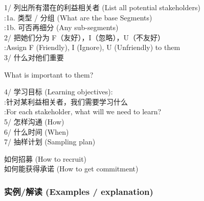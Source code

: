 1/ 列出所有潜在的利益相关者 (List all potential stakeholders)\\
:1a. 类型 / 分组 (What are the base Segments)\\
:1b. 可否再细分 (Any sub-segments)\\
2/ 把她们分为 F（友好），I（忽略），U（不友好）\\
:Assign F (Friendly), I (Ignore), U (Unfriendly) to them\\
3/ 什么对他们重要

\begin{description}
\tightlist
\item[]
What is important to them?\\
\end{description}

4/ 学习目标 (Learning objectives):\\
:针对某利益相关者，我们需要学习什么\\
:For each stakeholder, what will we need to learn?\\
5/ 怎样沟通 (How)\\
6/ 什么时间 (When)\\
7/ 抽样计划 (Sampling plan)

\begin{description}
\tightlist
\item[]
如何招募 (How to recruit)\\

如何能获得承诺 (How to get commitment)\\
\end{description}

\begin{description}
\item[]
\end{description}

\hypertarget{ux5b9eux4f8bux89e3ux8bfb-examples-explanation}{%
\subsubsection{\texorpdfstring{\textbf{实例/解读 (Examples /
explanation)}}{实例/解读 (Examples / explanation)}}\label{ux5b9eux4f8bux89e3ux8bfb-examples-explanation}}

